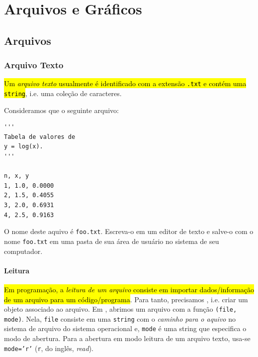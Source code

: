 
\chapter{Arquivos e Gráficos}\label{cap_ag}

\section{Arquivos}\label{cap_ag_sec_arq}

\subsection{Arquivo Texto}

\hl{Um \emph{arquivo texto} usualmente é identificado com a extensão \texttt{.txt} e contém uma \texttt{string}}, i.e. uma coleção de caracteres. 

Consideramos que o seguinte arquivo:

\begin{lstlisting}[caption = foo.txt, label=cap_ag_sec_arq:cod:foo.txt]
'''
Tabela de valores de
y = log(x).
'''

n, x, y
1, 1.0, 0.0000
2, 1.5, 0.4055
3, 2.0, 0.6931
4, 2.5, 0.9163
\end{lstlisting}

O nome deste aquivo é \texttt{foo.txt}. Escreva-o em um editor de texto e salve-o com o nome \texttt{foo.txt} em uma pasta de sua área de usuário no sistema de seu computador.

\subsubsection{Leitura}

\hl{Em programação, a \emph{leitura de um arquivo} consiste em importar dados/informação de um arquivo para um código/programa}. Para tanto, precisamos , i.e. criar um objeto {\PYTHONfile} associado ao arquivo. Em {\python}, abrimos um arquivo com a função {\PYTHONopen}\texttt{(file, mode)}. Nela, \texttt{file} consiste em uma \lstinline+string+ com o \emph{caminho para o aquivo} no sistema de arquivo do sistema operacional e, \texttt{mode} é uma string que especifica o modo de abertura. Para a abertura em modo leitura de um arquivo texto, usa-se \texttt{mode='r'} (\texttt{r}, do inglês, \textit{read}).

